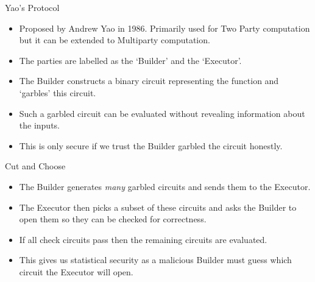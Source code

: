 \documentclass[t, 12pt]{beamer}            %
\begin{document}
\begin{frame}{Yao's Protocol}
	\begin{itemize} %
		\item Proposed by Andrew Yao in 1986. Primarily used for Two Party computation but it can be extended to Multiparty computation.
		\item The parties are labelled as the `Builder' and the `Executor'.
		\item The Builder constructs a binary circuit representing the function and `garbles' this circuit.
		\item Such a garbled circuit can be evaluated without revealing information about the inputs.
		\item This is only secure if we trust the Builder garbled the circuit honestly.
	\end{itemize}
\end{frame}


%	


\begin{frame}{Cut and Choose}
	\begin{itemize} %
		\item The Builder generates \emph{many} garbled circuits and sends them to the Executor.
		\item The Executor then picks a subset of these circuits and asks the Builder to open them so they can be checked for correctness.
		\item If all check circuits pass then the remaining circuits are evaluated.
		\item This gives us statistical security as a malicious Builder must guess which circuit the Executor will open.
	\end{itemize}
\end{frame}
\end{document}
